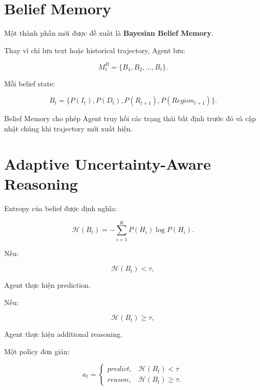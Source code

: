 \documentclass[11pt,a4paper]{article}
\begin{document}
	\section{Belief Memory}
	
	Một thành phần mới được đề xuất là \textbf{Bayesian Belief Memory}.
	
	Thay vì chỉ lưu text hoặc historical trajectory, Agent lưu:
	
	\begin{equation}
		M_t^{B}
		=
		\{
		B_1,B_2,\ldots,B_t
		\}.
	\end{equation}
	
	Mỗi belief state:
	
	\begin{equation}
		B_t
		=
		\{
		P(I_t),
		P(D_t),
		P(R_{t+1}),
		P(Region_{t+1})
		\}.
	\end{equation}
	
	Belief Memory cho phép Agent truy hồi các trạng thái bất định trước đó
	và cập nhật chúng khi trajectory mới xuất hiện.
	
	\section{Adaptive Uncertainty-Aware Reasoning}
	
	Entropy của belief được định nghĩa:
	
	\begin{equation}
		\mathcal{H}(B_t)
		=
		-\sum_{i=1}^{K}
		P(H_i)
		\log P(H_i).
	\end{equation}
	
	Nếu:
	
	\begin{equation}
		\mathcal{H}(B_t)<\tau,
	\end{equation}
	
	Agent thực hiện prediction.
	
	Nếu:
	
	\begin{equation}
		\mathcal{H}(B_t)\geq\tau,
	\end{equation}
	
	Agent thực hiện additional reasoning.
	
	Một policy đơn giản:
	
	\begin{equation}
		a_t
		=
		\begin{cases}
			predict,
			&
			\mathcal{H}(B_t)<\tau
			\\
			reason,
			&
			\mathcal{H}(B_t)\geq\tau.
		\end{cases}
	\end{equation}
	
\end{document}
